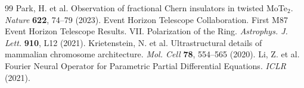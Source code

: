 \documentclass[10pt,twocolumn,letterpaper]{article}
\begin{document}

\begin{thebibliography}{99}
 Park, H. et al. Observation of fractional Chern insulators in twisted MoTe$_2$. \textit{Nature} \textbf{622}, 74--79 (2023).
 Event Horizon Telescope Collaboration. First M87 Event Horizon Telescope Results. VII. Polarization of the Ring. \textit{Astrophys. J. Lett.} \textbf{910}, L12 (2021).
 Krietenstein, N. et al. Ultrastructural details of mammalian chromosome architecture. \textit{Mol. Cell} \textbf{78}, 554--565 (2020).
 Li, Z. et al. Fourier Neural Operator for Parametric Partial Differential Equations. \textit{ICLR} (2021).
\end{thebibliography}
\end{document}
